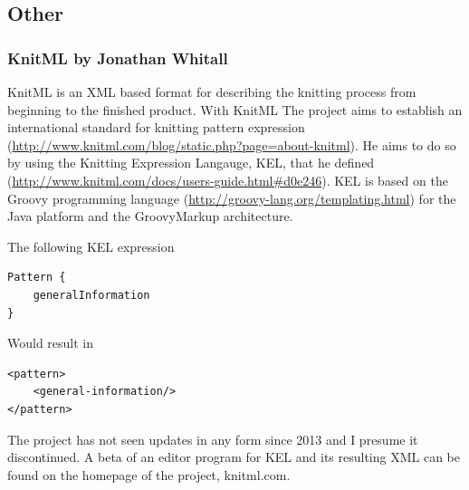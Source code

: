 \subsection{Other}

\subsubsection{KnitML by Jonathan Whitall}
KnitML is an XML based format for describing the knitting process from beginning to the finished product. With KnitML The project aims to establish an international standard for knitting pattern expression (\url{http://www.knitml.com/blog/static.php?page=about-knitml}). He aims to do so by using the Knitting Expression Langauge, KEL, that he defined (\url{http://www.knitml.com/docs/users-guide.html#d0e246}). KEL is based on the Groovy programming language (\url{http://groovy-lang.org/templating.html}) for the Java platform and the GroovyMarkup architecture.

The following KEL expression

\begin{lstlisting}
Pattern {
    generalInformation
}
\end{lstlisting}

Would result in

\begin{lstlisting}
<pattern>
    <general-information/>
</pattern>
\end{lstlisting}

The project has not seen updates in any form since 2013 and I presume it discontinued. A beta of an editor program for KEL and its resulting XML can be found on the homepage of the project, knitml.com.